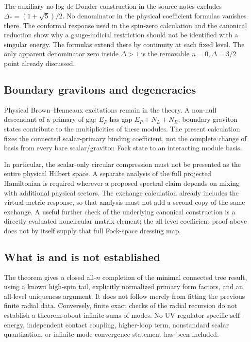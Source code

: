 \documentclass[11pt,a4paper]{article}
\numberwithin{equation}{section}
\theoremstyle{remark}\newtheorem{remark}[theorem]{Remark}
\begin{document}
The auxiliary no-log de Donder construction in the source notes excludes
$\Delta_*=(1+\sqrt5)/2$. No denominator in the physical coefficient formulas vanishes there. The conformal response used in the spin-zero calculation and the canonical reduction show why a gauge-indicial restriction should not be identified with a singular energy. The formulas extend there by continuity at each fixed level. The only apparent denominator zero inside $\Delta>1$ is the removable $n=0,\Delta=3/2$ point already discussed.

\subsection{Boundary gravitons and degeneracies}

Physical Brown--Henneaux excitations remain in the theory. A non-null descendant of a primary of gap $E_P$ has gap $E_P+N_L+N_R$; boundary-graviton states contribute to the multiplicities of these modules. The present calculation fixes the connected scalar-primary binding coefficient, not the complete change of basis from every bare scalar/graviton Fock state to an interacting module basis.

In particular, the scalar-only circular compression must not be presented as the entire physical Hilbert space. A separate analysis of the full projected Hamiltonian is required wherever a proposed spectral claim depends on mixing with additional physical sectors. The exchange calculation already includes the virtual metric response, so that analysis must not add a second copy of the same exchange. A useful further check of the underlying canonical construction is a directly evaluated noncircular matrix element; the all-level coefficient proof above does not by itself supply that full Fock-space dressing map.

\subsection{What is and is not established}

The theorem gives a closed all-$n$ completion of the minimal connected tree result, using a known high-spin tail, explicitly normalized primary form factors, and an all-level uniqueness argument. It does not follow merely from fitting the previous finite radial data. Conversely, finite exact checks of the radial recursion do not establish a theorem about infinite sums of modes. No UV regulator-specific self-energy, independent contact coupling, higher-loop term, nonstandard scalar quantization, or infinite-mode convergence statement has been included.
\end{document}
